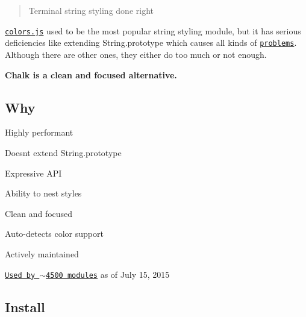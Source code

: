 \section*{~\newline
 ~\newline
  ~\newline
 ~\newline
 ~\newline
 }

\begin{quote}
Terminal string styling done right \end{quote}


\href{https://travis-ci.org/chalk/chalk}{\tt } \href{https://coveralls.io/r/chalk/chalk?branch=master}{\tt } \href{https://www.youtube.com/watch?v=9auOCbH5Ns4}{\tt }

\href{https://github.com/Marak/colors.js}{\tt colors.\+js} used to be the most popular string styling module, but it has serious deficiencies like extending {\ttfamily String.\+prototype} which causes all kinds of \href{https://github.com/yeoman/yo/issues/68}{\tt problems}. Although there are other ones, they either do too much or not enough.

{\bfseries Chalk is a clean and focused alternative.}



\subsection*{Why}


\begin{DoxyItemize}
\item Highly performant
\item Doesn\textquotesingle{}t extend {\ttfamily String.\+prototype}
\item Expressive A\+PI
\item Ability to nest styles
\item Clean and focused
\item Auto-\/detects color support
\item Actively maintained
\item \href{https://www.npmjs.com/browse/depended/chalk}{\tt Used by $\sim$4500 modules} as of July 15, 2015
\end{DoxyItemize}

\subsection*{Install}


